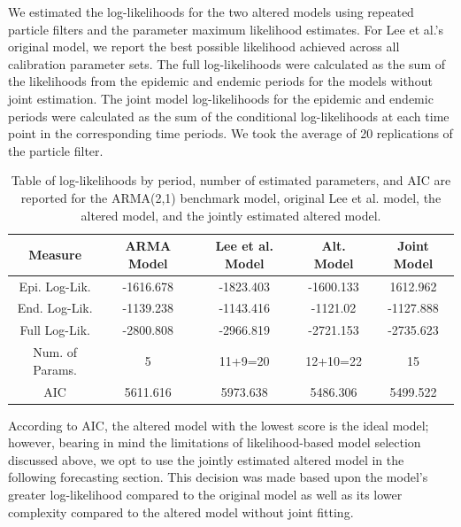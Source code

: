 \documentclass[12pt]{article}
\begin{document}
  We estimated the log-likelihoods for the two altered models using repeated particle filters and the parameter maximum likelihood estimates. For Lee et al.'s original model, we report the best possible likelihood achieved across all calibration parameter sets. The full log-likelihoods were calculated as the sum of the likelihoods from the epidemic and endemic periods for the models without joint estimation. The joint model log-likelihoods for the epidemic and endemic periods were calculated as the sum of the conditional log-likelihoods at each time point in the corresponding time periods. We took the average of 20 replications of the particle filter. 
        \begin{table}[H]
        \caption{Table of log-likelihoods by period, number of estimated parameters, and AIC are reported for the ARMA(2,1) benchmark model, original Lee et al. model, the altered model, and the jointly estimated altered model.}
        \label{tab:1}
        \begin{center}
        \begin{tabular}{||c | c c c c||}
         \hline
         Measure & ARMA Model & Lee et al. Model & Alt. Model & Joint Model \\ [0.5ex]
         \hline\hline
         Epi. Log-Lik. & -1616.678 & -1823.403 & -1600.133 & 1612.962 \\
         \hline
         End. Log-Lik. & -1139.238 & -1143.416 & -1121.02 & -1127.888 \\
         \hline
         Full Log-Lik. & -2800.808 & -2966.819 & -2721.153 & -2735.623 \\
         \hline
         Num. of Params. & 5 & 11+9=20 & 12+10=22 & 15 \\
         \hline
         AIC & 5611.616 & 5973.638 & 5486.306 & 5499.522 \\
         \hline
        \end{tabular}
        \end{center}
        \end{table}
        
  According to AIC, the altered model with the lowest score is the ideal model; however, bearing in mind the limitations of likelihood-based model selection discussed above, we opt to use the jointly estimated altered model in the following forecasting section. This decision was made based upon the model's greater log-likelihood compared to the original model as well as its lower complexity compared to the altered model without joint fitting. 
\end{document}

